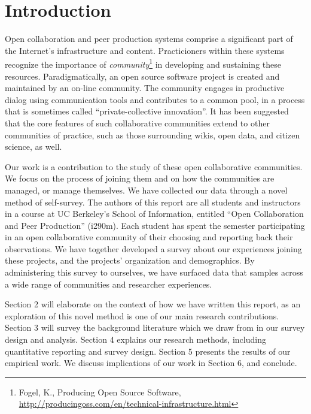 \section{Introduction}

Open collaboration and peer production systems comprise a significant
part of the Internet's infrastructure and content.
Practicioners within these systems recognize the importance of
\emph{community}\footnote{Fogel, K., Producing Open Source Software, \url{http://producingoss.com/en/technical-infrastructure.html}} in developing and sustaining these resources.
Paradigmatically, an open source software project is created and maintained by an on-line community.
The community engages in productive dialog using communication tools and contributes to
a common pool\cite{ostrom1990}, in a process that is sometimes called ``private-collective innovation''.\cite{vonhippel2003oss}
It has been suggested that the core features of such collaborative
communities extend to other communities of practice, such as those
surrounding wikis, open data, and citizen science, as well.

Our work is a contribution to the study of these open collaborative
communities.
We focus on the process of joining them and on how
the communities are managed, or manage themselves.
We have collected our data through a novel method of self-survey. 
The authors of this report are all students and instructors in a
course at UC Berkeley's School of Information, entitled ``Open Collaboration and Peer Production'' (i290m).
Each student has spent the semester participating in an open
collaborative community of their choosing and reporting back
their observations.
We have together developed a survey about our experiences joining
these projects, and the projects' organization and demographics.
By administering this survey to ourselves, we have surfaced data
that samples across a wide range of communities and researcher experiences.

Section 2 will elaborate on the context of how we have written this report, as an exploration of this novel method is one of our main research contributions.
Section 3 will survey the background literature which we draw from in
our survey design and analysis.
Section 4 explains our research methods, including quantitative
reporting and survey design.
Section 5 presents the results of our empirical work.
We discuss implications of our work in Section 6, and conclude. 


